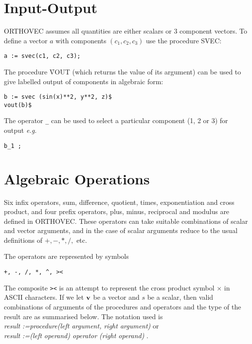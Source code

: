 \section{Input-Output}

ORTHOVEC assumes all quantities are either scalars or 3 component
vectors.  To define a vector $a$ with components $(c_1, c_2, c_3)$ use
the procedure SVEC:
\begin{verbatim}
a := svec(c1, c2, c3);
\end{verbatim}

The procedure \f{VOUT} (which returns the value of its
argument) can be used to give labelled output of components
in algebraic form:
\begin{verbatim}
b := svec (sin(x)**2, y**2, z)$
vout(b)$
\end{verbatim}

The operator {\tt \_} can be used to select a particular
component (1, 2 or 3) for output {\em e.g.}
\begin{verbatim}
b_1 ;
\end{verbatim}

\section{Algebraic Operations}

Six infix operators, sum, difference, quotient, times, exponentiation
and cross product, and four prefix
operators, plus, minus, reciprocal
and  modulus are defined in ORTHOVEC.  These operators can take suitable
combinations of scalar and vector arguments,
and in the case of scalar arguments reduce to the usual definitions of
$ +, -, *, /, $ etc.

The operators are represented by symbols
\begin{verbatim}
+, -, /, *, ^, ><
\end{verbatim}

 The composite {\tt ><} is an
attempt to represent the cross product symbol
$\times$ in ASCII characters.
If we let ${\bf v}$ be a vector and $s$ be a scalar, then
valid combinations of arguments of the
procedures and operators and the type of the result
are as summarised below.  The notation used is\\
{\em result :=procedure(left argument, right argument) } or\\
{\em result :=(left operand) operator (right operand) } . \\

